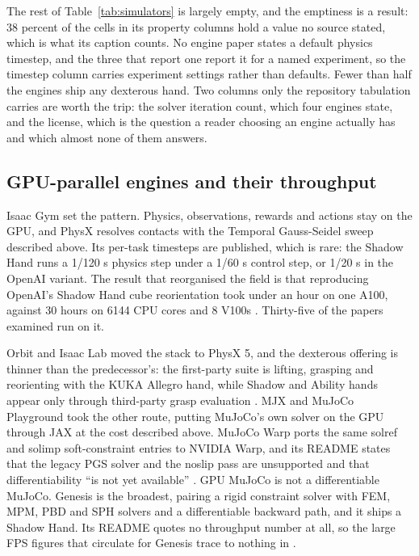 The rest of Table~\ref{tab:simulators} is largely empty, and the emptiness is a result: 38
percent of the cells in its property columns hold a value no source stated, which is what its
caption counts. No engine paper states a default physics timestep, and the three that report one
report it for a named experiment, so the timestep column carries experiment settings rather than
defaults. Fewer than half the engines ship any dexterous hand. Two columns only the repository
tabulation carries are worth the trip: the solver iteration count, which four engines state, and
the license, which is the question a reader choosing an engine actually has and which almost none
of them answers.


\subsection{GPU-parallel engines and their throughput}
\label{sec:sim:gpu}

Isaac Gym set the pattern. Physics, observations, rewards and
actions stay on the GPU, and PhysX resolves contacts with the Temporal Gauss-Seidel sweep
described above. Its per-task timesteps are published, which is rare: the Shadow Hand runs a
1/120 s physics step under a 1/60 s control step, or 1/20 s in the OpenAI variant. The result
that reorganised the field is that reproducing OpenAI's Shadow Hand cube reorientation took
under an hour on one A100, against 30 hours on 6144 CPU cores and 8 V100s
\cite[Sec.~6.4.1]{isaacgym_2021}. Thirty-five of the papers examined run on it.

Orbit and Isaac Lab moved the stack to PhysX 5, and the dexterous offering is thinner than the
predecessor's: the first-party suite is lifting, grasping and reorienting with the KUKA Allegro
hand, while Shadow and Ability hands appear only through third-party grasp evaluation
\cite[Sec.~7.2.3]{isaaclab_2025}. MJX and MuJoCo Playground took the other route, putting MuJoCo's
own solver on the GPU through JAX at the cost described above. MuJoCo Warp ports the same solref
and solimp soft-constraint entries to NVIDIA Warp, and its README states that the legacy PGS solver
and the noslip pass are unsupported and that differentiability ``is not yet available''
\cite{mujoco_warp_2025}. GPU MuJoCo is not a differentiable MuJoCo. Genesis is the broadest,
pairing a rigid constraint solver with FEM, MPM, PBD and SPH solvers and a differentiable backward
path, and it ships a Shadow Hand. Its README quotes no throughput number at all, so the large FPS
figures that circulate for Genesis trace to nothing in \cite{genesis_2024}.

